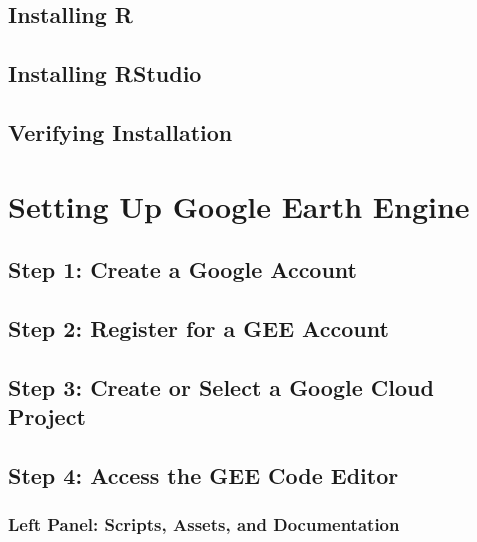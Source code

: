\documentclass[
  10pt,
  b5paper,
  oneside]{book}
\begin{document}
\subsection{Installing R}\label{installing-r}

\subsection{Installing RStudio}\label{installing-rstudio}

\subsection{Verifying Installation}\label{verifying-installation}

\section*{Setting Up Google Earth Engine}\label{setting-up-google-earth-engine}

\subsection{Step 1: Create a Google Account}\label{step-1-create-a-google-account}

\subsection{Step 2: Register for a GEE Account}\label{step-2-register-for-a-gee-account}

\subsection{Step 3: Create or Select a Google Cloud Project}\label{step-3-create-or-select-a-google-cloud-project}

\subsection{Step 4: Access the GEE Code Editor}\label{step-4-access-the-gee-code-editor}

\subsubsection{Left Panel: Scripts, Assets, and Documentation}\label{left-panel-scripts-assets-and-documentation}
\end{document}

